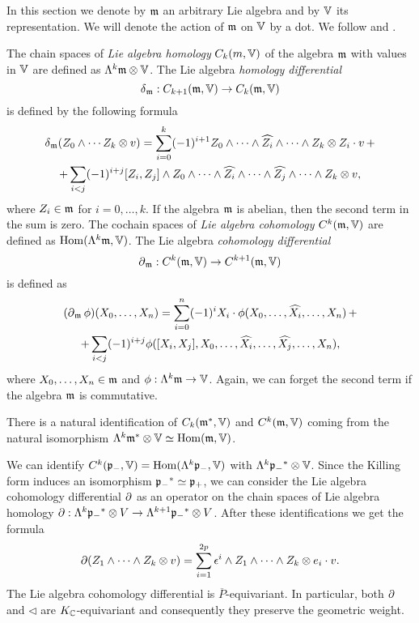 In this section we denote by $\mathfrak{m}$ an arbitrary Lie algebra and by $\mathbb{V}$ its representation. We will denote the action of $\mathfrak{m}$ on $\mathbb{V}$ by a dot. We follow \cite{kostant_lie_1961} and \cite{cap_parabolic_2009}.

The chain spaces of \emph{Lie algebra homology} $C_k(m,\mathbb{V})$ of the algebra $\mathfrak{m}$ with values in $\mathbb{V}$ are defined as $\Lambda^k\mathfrak{m}\otimes\mathbb{V}$. The Lie algebra \emph{homology differential} \[\operatorname{\delta}_{\mathfrak{m}} : C_{k+1}(\mathfrak{m},\mathbb{V}) \to C_k(\mathfrak{m},\mathbb{V})\] is defined by the following formula
\begin{multline*}
\operatorname{\delta}_{\mathfrak{m}} (Z_0\wedge\cdots Z_k\otimes v) = \sum_{i=0}^k (-1)^{i+1} Z_0\wedge\cdots\wedge\widehat{Z_i}\wedge\cdots\wedge Z_k\otimes Z_i\cdot v\,  + \\
				      +\sum_{i<j} (-1)^{i+j} [Z_i,Z_j]\wedge Z_0\wedge\cdots\wedge\widehat{Z_i}\wedge\cdots\wedge\widehat{Z_j}\wedge\cdots\wedge Z_k\otimes v,
\end{multline*}
where $Z_i\in\mathfrak{m}$ for $i=0,\ldots,k$. If the algebra $\mathfrak{m}$ is abelian, then the second term in the sum is zero. The cochain spaces of \emph{Lie algebra cohomology} $C^k(\mathfrak{m},\mathbb{V})$ are defined as $\mathrm{Hom}(\Lambda^k \mathfrak{m},\mathbb{V})$. The Lie algebra \emph{cohomology differential} \[\operatorname{\partial}_{\mathfrak{m}} :  C^k(\mathfrak{m},\mathbb{V}) \to C^{k+1}(\mathfrak{m},\mathbb{V})\] is defined as
\begin{multline*}
 (\operatorname{\partial}_{\mathfrak{m}} \phi)(X_0,\ldots, X_n) = \sum_{i=0}^n (-1)^i X_i \cdot \phi(X_0,\ldots,\widehat{X_i},\ldots, X_n)\, + \\
				+\sum_{i<j} (-1)^{i+j} \phi([X_i,X_j],X_0,\ldots,\widehat{X_i},\ldots,\widehat{X_j},\ldots,X_n),
\end{multline*}
where $X_0,\ldots, X_n \in \mathfrak{m}$ and $\phi:\Lambda^k \mathfrak{m} \to \mathbb{V}$. Again, we can forget the second term if the algebra $\mathfrak{m}$ is commutative.

There is a natural identification of $C_k(\mathfrak{m}^*,\mathbb{V})$ and $C^k(\mathfrak{m},\mathbb{V})$ coming from the natural isomorphism $\Lambda^k \mathfrak{m}^* \otimes \mathbb{V} \simeq \mathrm{Hom}(\mathfrak{m},\mathbb{V})$.

We can identify $C^k(\mathfrak{p}_-,\mathbb{V})=\mathrm{Hom} (\Lambda^k\mathfrak{p}_-,\mathbb{V})$ with $\Lambda^k {\mathfrak{p}_-}^*\otimes\mathbb{V}$. Since the Killing form induces an isomorphism ${\mathfrak{p}_-}^* \simeq \mathfrak{p}_+$, we can consider the Lie algebra cohomology differential $\operatorname{\partial}$ as an operator on the chain spaces of Lie algebra homology $\operatorname{\partial}: \Lambda^k {\mathfrak{p}_-}^* \otimes V \to \Lambda^{k+1}{\mathfrak{p}_-}^*\otimes V$. After these identifications we get the formula
\[
 \operatorname{\partial}  (Z_1\wedge\cdots\wedge Z_k\otimes v) = \sum_{i=1}^{2p} \epsilon^i \wedge Z_1\wedge\cdots\wedge Z_k\otimes e_i\cdot v.
\] The Lie algebra cohomology differential is $\overline{P}$-equivariant. In particular, both $\operatorname{\partial}$ and $\lhd$ are $K_{\mathbb{C}}$-equivariant and consequently they preserve the geometric weight.



